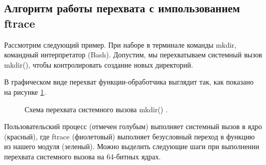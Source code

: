 \documentclass[a4paper,14pt]{article}
\begin{document}
\subsection{Алгоритм работы перехвата с импользованием ftrace}

Рассмотрим следующий пример. При наборе в терминале команды mkdir, командный интерпретатор (Bash). Допустим, мы перехватываем системный вызов mkdir(), чтобы контролировать создание новых директорий.

В графическом виде перехват функции-обработчика выглядит так, как показано на рисунке \ref{fig:lshook}.

\begin{figure}[!h]
    \caption{Схема перехвата системного вызова mkdir() \cite{ftrace}.}
    \label{fig:lshook}
\end{figure}

Пользовательский процесс (отмечен голубым) выполняет системный вызов в ядро (красный), где ftrace (фиолетовый) выполняет безусловный переход в функцию из нашего модуля (зеленый). Можно выделить следующие шаги при выполнении перехвата системного вызова на 64-битных ядрах.
\end{document}
